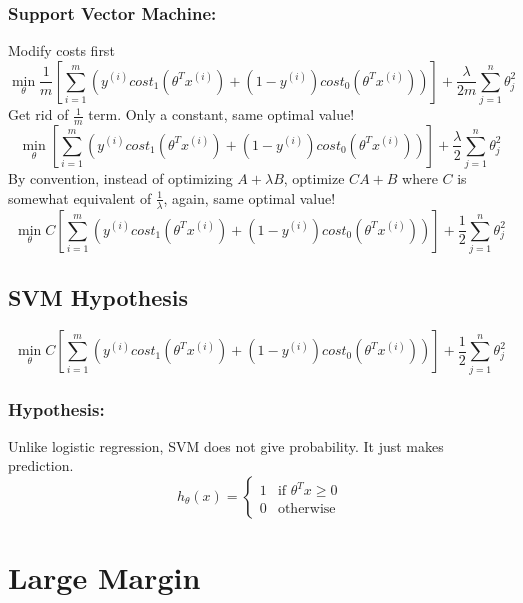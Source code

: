 \subsubsection{Support Vector Machine:}
Modify costs first
\begin{equation*}
	\min_\theta \frac{1}{m}\left[
	\sum_{i=1}^m \left(
	y^{(i)}{cost}_1(\theta^Tx^{(i)}) +
	(1 - y^{(i)}){cost}_0(\theta^Tx^{(i)})
	\right)
	\right] + \frac{\lambda}{2m}\sum_{j=1}^n\theta_j^2
\end{equation*}
Get rid of $\frac{1}{m}$ term. Only a constant, same optimal value!
\begin{equation*}
	\min_\theta \left[
	\sum_{i=1}^m \left(
	y^{(i)}{cost}_1(\theta^Tx^{(i)}) +
	(1 - y^{(i)}){cost}_0(\theta^Tx^{(i)})
	\right)
	\right] + \frac{\lambda}{2}\sum_{j=1}^n\theta_j^2
\end{equation*}
By convention, instead of optimizing $A + \lambda B$, optimize $CA + B$ where
$C$ is somewhat equivalent of $\frac{1}{\lambda}$, again, same optimal value!
\begin{equation*}
	\min_\theta C\left[
	\sum_{i=1}^m \left(
	y^{(i)}{cost}_1(\theta^Tx^{(i)}) +
	(1 - y^{(i)}){cost}_0(\theta^Tx^{(i)})
	\right)
	\right] + \frac{1}{2}\sum_{j=1}^n\theta_j^2
\end{equation*}

\subsection{SVM Hypothesis}
\begin{equation*}
	\min_\theta C\left[
	\sum_{i=1}^m \left(
	y^{(i)}{cost}_1(\theta^Tx^{(i)}) +
	(1 - y^{(i)}){cost}_0(\theta^Tx^{(i)})
	\right)
	\right] + \frac{1}{2}\sum_{j=1}^n\theta_j^2
\end{equation*}

\subsubsection{Hypothesis:}
Unlike logistic regression, SVM does not give probability. It just makes prediction.
\begin{equation*}
	h_\theta(x) = \begin{cases}
		1 & \text{if } \theta^Tx \ge 0 \\
		0 & \text{otherwise}
	\end{cases}
\end{equation*}

\section{Large Margin}
